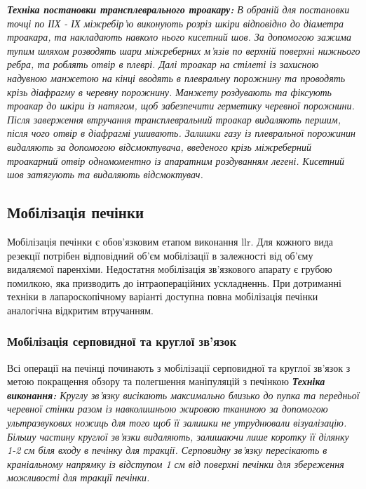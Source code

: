 \begin{refsection}
\textit{ \textbf{Техніка постановки трансплеврального троакару:} В обраній для постановки точці по ІІХ - ІХ  міжребір'ю виконують розріз шкіри відповідно до діаметра троакара, та накладають навколо нього кисетний шов. За допомогою зажима тупим шляхом розводять шари міжреберних м'язів по верхній поверхні нижнього ребра, та роблять отвір в плеврі. Далі троакар на стілеті із захисною надувною манжетою на кінці вводять в плевральну порожнину та проводять крізь діафрагму в черевну порожнину. Манжету роздувають та фіксують троакар до шкіри із натягом, щоб забезпечити герметику черевної порожнини. Після заверження втручання трансплевральний троакар видаляють першим, після чого отвір в діафрагмі ушивають. Залишки газу із плевральної порожинин видаляють за допомогою відсмоктувача, введеного крізь міжреберний троакарний отвір одномоментно із апаратним роздуванням легені. Кисетний шов затягують та видаляють відсмоктувач. }

\subsection{Мобілізація печінки}

Мобілізація печінки є обов'язковим етапом виконання \acrshort{llr}. Для кожного вида резекції потрібен відповідний об'єм мобілізації в залежності від об'єму видаляємої паренхіми. Недостатня мобілізація зв'язкового апарату є грубою помилкою, яка призводить до інтраопераційних ускладненнь. При дотриманні техніки в лапароскопічному варіанті доступна повна мобілізація печінки аналогічна відкритим втручанням. 

\subsubsection{Мобілізація серповидної та круглої зв'язок}

Всі операції на печінці починають з мобілізації серповидної та круглої зв'язок з метою покращення обзору та полегшення маніпуляцій з печінкою 
\textit{ \textbf{Техніка виконання:} Круглу зв'язку висікають максимально близько до пупка та передньої черевної стінки разом із навколишньою жировою тканиною за допомогою ультразвукових ножиць для того щоб її залишки не утруднювали візуалізацію. Більшу частину круглої зв'язки видаляють, залишаючи лише коротку її ділянку 1-2 см біля входу в печінку для тракції.  Серповидну зв'язку пересікають в краніальному напрямку із відступом 1 см від поверхні печінки для збереження можливості для тракції печінки.}


\end{refsection}
